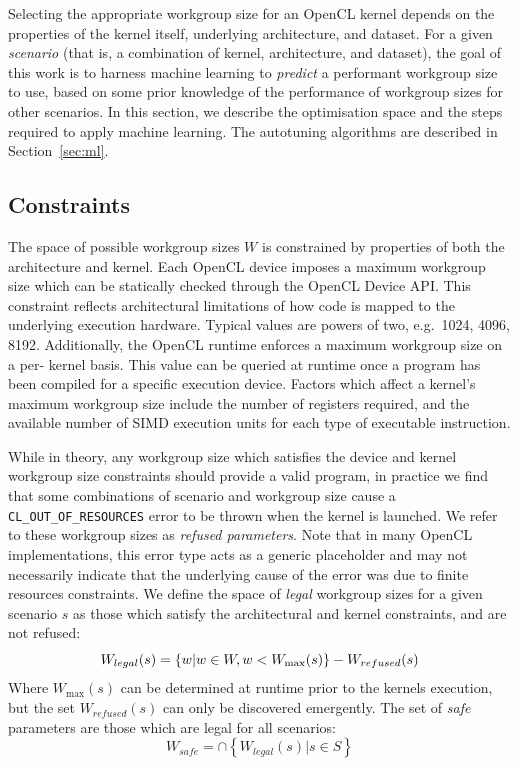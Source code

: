 \documentclass[preprint,nonatbib,10pt,nocopyrightspace]{sigplanconf}
\begin{document}
  Selecting the appropriate workgroup size for an OpenCL kernel depends on the
  properties of the kernel itself, underlying architecture, and dataset. For a
  given \emph{scenario} (that is, a combination of kernel, architecture, and
  dataset), the goal of this work is to harness machine learning to \emph{predict}
  a performant workgroup size to use, based on some prior knowledge of the
  performance of workgroup sizes for other scenarios. In this section, we describe
  the optimisation space and the steps required to apply machine learning. The
  autotuning algorithms are described in Section~\ref{sec:ml}.

  \subsection{Constraints}

  The space of possible workgroup sizes $W$ is constrained by properties of both
  the architecture and kernel. Each OpenCL device imposes a maximum workgroup size
  which can be statically checked through the OpenCL Device API. This constraint
  reflects architectural limitations of how code is mapped to the underlying
  execution hardware. Typical values are powers of two, e.g.\ 1024, 4096, 8192.
  Additionally, the OpenCL runtime enforces a maximum workgroup size on a per-
  kernel basis. This value can be queried at runtime once a program has been
  compiled for a specific execution device. Factors which affect a kernel's
  maximum workgroup size include the number of registers required, and the
  available number of SIMD execution units for each type of executable
  instruction.

  While in theory, any workgroup size which satisfies the device and kernel
  workgroup size constraints should provide a valid program, in practice we find
  that some combinations of scenario and workgroup size cause a
  \texttt{CL\_OUT\_OF\_RESOURCES} error to be thrown when the kernel is launched.
  We refer to these workgroup sizes as \emph{refused parameters}. Note that in
  many OpenCL implementations, this error type acts as a generic placeholder and
  may not necessarily indicate that the underlying cause of the error was due to
  finite resources constraints. We define the space of \emph{legal} workgroup
  sizes for a given scenario $s$ as those which satisfy the architectural and
  kernel constraints, and are not refused:
  \begin{equation}
    \footnotesize
    W_{legal}(s) = \left\{w | w \in W, w < W_{\max}(s) \right\} - W_{refused}(s)
  \end{equation}
  Where $W_{\max}(s)$ can be determined at runtime prior to the kernels execution,
  but the set $W_{refused}(s)$ can only be discovered emergently. The set of
  \emph{safe} parameters are those which are legal for all scenarios:
  \begin{equation}
    W_{safe} = \cap \left\{ W_{legal}(s) | s \in S \right\}
  \end{equation}
\end{document}
